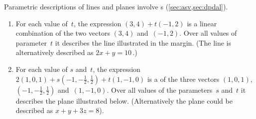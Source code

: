 \begin{example} \label{eg:lcs}
Parametric descriptions of lines and planes  involve s (\cref{sec:asv,sec:dpdal}).
\begin{enumerate}
\item 
For each value of~\(t\), the expression \((3,4)+t(-1,2)\) is a linear combination of the two vectors \((3,4)\) and~\((-1,2)\).  
%
Over all values of parameter~\(t\) it describes the line illustrated in the margin.
(The line is alternatively described as \(2x+y=10\)\,.)


\item For each value of \(s\) and~\(t\), the expression \(2(1,0,1)+s(-1,-\frac12,\frac12)+t(1,-1,0)\) is a  of the three vectors \((1,0,1)\), \((-1,-\frac12,\frac12)\) and~\((1,-1,0)\).
Over all values of the parameters~\(s\) and~\(t\) it describes the plane illustrated below.
(Alternatively the plane could be described as \(x+y+3z=8\)).
\begin{center}
 {}
\end{center}



\end{enumerate}
\end{example}
